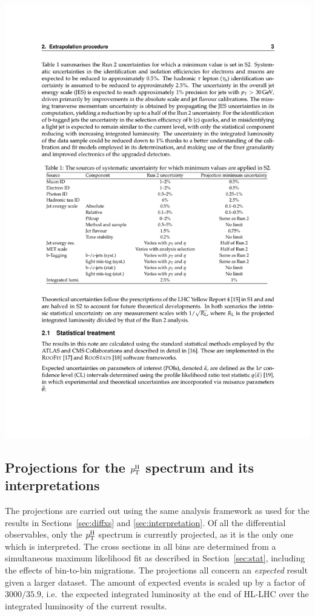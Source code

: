 \begin{table}[hbtp]
\centering
{}
\label{tab:s2unc}
\includegraphics[width=0.99\linewidth]{img/projections/hllhc-unc-s2.pdf}
\end{table}



\subsection{Projections for the  \texorpdfstring{$p_\mathrm{T}^\mathrm{H}$}{pT(H)} spectrum and its interpretations}
\label{sec:projection-results}

The projections are carried out using the same analysis framework as used for the results in Sections~\ref{sec:diffxs} and \ref{sec:interpretation}.
% 
Of all the differential observables, only the $p_\mathrm{T}^\mathrm{H}$ spectrum is currently projected, as it is the only one which is interpreted.
% 
The cross sections in all bins are determined from a simultaneous maximum likelihood fit as described in Section~\ref{sec:stat}, including the effects of bin-to-bin migrations.
% 
The projections all concern an \emph{expected} result given a larger dataset.
% 
The amount of expected events is scaled up by a factor of $3000 / 35.9$, i.e.\ the expected integrated luminosity at the end of HL-LHC over the integrated luminosity of the current results.


